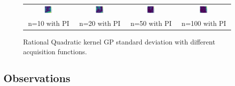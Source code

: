 \documentclass[11pt]{article}
\begin{document}
\begin{figure}[H]
\begin{tabular}{cccc}
        \includegraphics[width=0.225\textwidth]{../Task-02/plots/gp_std_rational_quadratic_n10_PI.png} &
        \includegraphics[width=0.225\textwidth]{../Task-02/plots/gp_std_rational_quadratic_n20_PI.png} &
        \includegraphics[width=0.225\textwidth]{../Task-02/plots/gp_std_rational_quadratic_n50_PI.png} &
        \includegraphics[width=0.225\textwidth]{../Task-02/plots/gp_std_rational_quadratic_n100_PI.png} \\
        n=10 with PI & n=20 with PI & n=50 with PI & n=100 with PI \\
    \end{tabular}
    \caption{Rational Quadratic kernel GP standard deviation with different acquisition functions.}
    \label{fig:rational_quadratic_gp_std}
\end{figure}

\subsection*{Observations}
\end{document}
